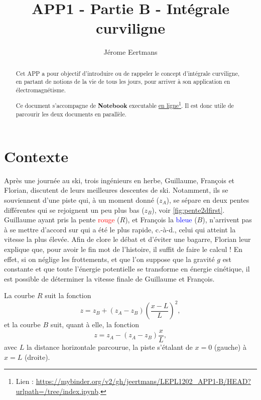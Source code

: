 \documentclass{cup-pan}
\author{Jérome Eertmans}
\title{APP1 - Partie B - Intégrale curviligne}
\date{}
\begin{document}
\maketitle

\pagestyle{fancy}

\begin{abstract}

Cet APP a pour objectif d'introduire ou de rappeler le concept d'intégrale curviligne, en partant de notions de la vie de tous les jours, pour arriver à son application en électromagnétisme.

Ce document s'accompagne de \textbf{Notebook} executable \href{https://mybinder.org/v2/gh/jeertmans/LEPL1202_APP1-B/HEAD?urlpath=/tree/index.ipynb}{en ligne}\footnote{Lien : \url{https://mybinder.org/v2/gh/jeertmans/LEPL1202_APP1-B/HEAD?urlpath=/tree/index.ipynb}.}. Il est donc utile de parcourir les deux documents en parallèle.


\end{abstract}

\section{Contexte}

Après une journée au ski, trois ingénieurs en herbe, Guillaume, François et Florian, discutent de leurs meilleures descentes de ski. Notamment, ils se souviennent d'une piste qui, à un moment donné ($z_A$), se sépare en deux pentes différentes qui se rejoignent un peu plus bas ($z_B$), voir \autoref{fig:pente2dfirst}. Guillaume ayant pris la pente \textcolor{red}{rouge} ($R$), et François la \textcolor{blue}{bleue} ($B$), n'arrivent pas à se mettre d'accord sur qui a été le plus rapide, c.-à-d., celui qui atteint la vitesse la plus élevée. Afin de clore le débat et d'éviter une bagarre, Florian leur explique que, pour avoir le fin mot de l'histoire, il suffit de faire le calcul ! En effet, si on néglige les frottements, et que l'on suppose que la gravité $g$ est constante et que toute l'énergie potentielle se transforme en énergie cinétique, il est possible de déterminer la vitesse finale de Guillaume et François.

La courbe $R$ suit la fonction
\begin{equation}
    z = z_B + (z_A - z_B)\left(\frac{x-L}{L}\right)^2,
\end{equation}
et la courbe $B$ suit, quant à elle, la fonction
\begin{equation}
    z = z_A - (z_A - z_B)\frac{x}{L},
\end{equation}
avec $L$ la distance horizontale parcourue, la piste s'étalant de $x=0$ (gauche) à $x=L$ (droite).
\end{document}
